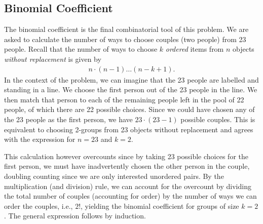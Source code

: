 \documentclass[11pt,a4paper]{article}
\begin{document}
\subsection{Binomial Coefficient}

The binomial coefficient is the final combinatorial tool of this problem. 
We are asked to calculate the number of ways to choose couples (two people) from 23 people. 
Recall that the number of ways to choose \(k\) \emph{ordered} items 
from \(n\) objects \emph{without replacement} is given by
\begin{align}
n\cdot(n - 1)\ldots(n - k + 1).
\end{align}
In the context of the problem, 
we can imagine that the 23 people are labelled and standing in a line. 
We choose the first person out of the 23 people in the line. 
We then match that person to each of the remaining people left in the pool of 22 people, 
of which there are 22 possible choices. 
Since we could have chosen any of the 23 people as the first person, 
we have \(23\cdot(23 - 1)\) possible couples. 
This is equivalent to choosing 2-groups from 23 objects without replacement and 
agrees with the expression for \(n=23\) and \(k=2\).

This calculation however overcounts since by taking 23 possible choices for the first person, 
we must have inadvertently chosen the other person in the couple,
doubling counting since we are only interested unordered pairs.
By the multiplication (and division) rule, 
we can account for the overcount by dividing the total number of couples (accounting for order) 
by the number of ways we can order the couples, i.e., \(2!\), 
yielding the binomial coefficient for groups of size \(k = 2\). 
The general expression follows by induction.
\end{document}
